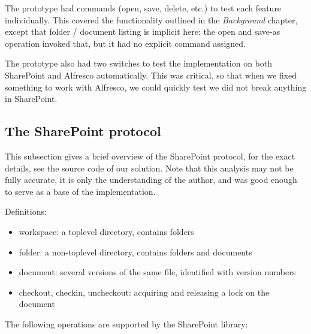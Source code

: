 The prototype had commands (open, save, delete, etc.) to test each feature
individually.  This covered the functionality outlined in the \emph{Background}
chapter, except that folder / document listing is implicit here: the open and
save-as operation invoked that, but it had no explicit command assigned.

The prototype also had two switches to test the implementation on both
SharePoint and Alfresco automatically. This was critical, so that when we fixed
something to work with Alfresco, we could quickly test we did not break
anything in SharePoint.

\subsection{The SharePoint protocol}

This subsection gives a brief overview of the SharePoint protocol, for the
exact details, see the source code of our solution. Note that this analysis may
not be fully accurate, it is only the understanding of the author, and was good
enough to serve as a base of the implementation.

Definitions:

\begin{itemize}
\item workspace: a toplevel directory, contains folders
\item folder: a non-toplevel directory, contains folders and documents
\item document: several versions of the same file, identified with version numbers
\item checkout, checkin, uncheckout: acquiring and releasing a lock on the document
\end{itemize}

The following operations are supported by the SharePoint library:

